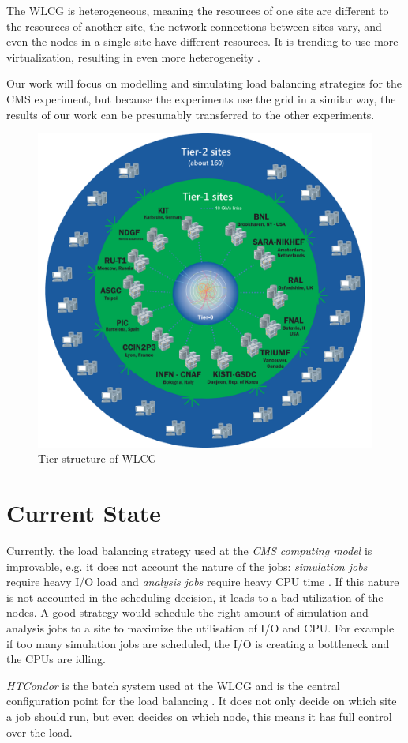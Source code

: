 The WLCG is heterogeneous, meaning the resources of one site are different to the resources of another site, the network connections between sites vary, and even the nodes in a single site have different resources. It is trending to use more virtualization, resulting in even more heterogeneity \cite{wlcg_update}.

Our work will focus on modelling and simulating load balancing strategies for the CMS experiment, but because the experiments use the grid in a similar way, the results of our work can be presumably transferred to the other experiments.

	\begin{figure}
		\centering
		\includegraphics[width=0.65\linewidth]{images/WLCG}
		\caption[]{Tier structure of WLCG \cite{wlcg_tiers}}
		\label{fig:wlcg}
	\end{figure}
	

\section{Current State}
Currently, the load balancing strategy used at the \textit{CMS computing model} is improvable, e.g. it does not account the nature of the jobs: \textit{simulation jobs} require heavy I/O load and \textit{analysis jobs} require heavy CPU time \cite{1742-6596-331-7-072038}. If this nature is not accounted in the scheduling decision, it leads to a bad utilization of the nodes. A good strategy would schedule the right amount of simulation and analysis jobs to a site to maximize the utilisation of I/O and CPU. For example if too many simulation jobs are scheduled, the I/O is creating a bottleneck and the CPUs are idling. 

\textit{HTCondor} is the batch system used at the WLCG and is the central configuration point for the load balancing \cite{wlcg_update}.
It does not only decide on which site a job should run, but even decides on which node, this means it has full control over the load.

